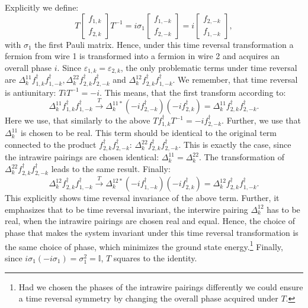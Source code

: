 Explicitly we define:
\begin{equation}
T\begin{bmatrix} f_{1,k} \\ f_{2,k} \end{bmatrix} T^{-1} = i\sigma_1 \begin{bmatrix} f_{1,-k} \\ f_{2,-k} \end{bmatrix} = i\begin{bmatrix} f_{2,-k} \\ f_{1,-k} \end{bmatrix},\nonumber
\end{equation} 
with $\sigma_1$ the first Pauli matrix. Hence, under this time reversal transformation a fermion from wire 1 is transformed into a fermion in wire 2 and acquires an overall phase $i$. Since $\varepsilon_{1,k} = \varepsilon_{2,k}$, the only problematic terms under time reversal are $\Delta^{11}_k f^\dagger_{1,k}f^\dagger_{1,-k}, \Delta^{22}_k f^\dagger_{2,k}f^\dagger_{2,-k}$ and $\Delta^{12}_kf^\dagger_{2,k}f^\dagger_{1,-k}$. We remember, that time reversal is antiunitary: $TiT^{-1} = -i$. This means, that the first transform according to:
\begin{equation}
\Delta^{11}_k f^\dagger_{1,k}f^\dagger_{1,-k} \overset{T}{\to} \Delta^{11*}_k \left(-i f^\dagger_{2,-k}\right)\left(-i f^\dagger_{2,k}\right) = \Delta^{11}_k f^\dagger_{2,k}f^\dagger_{2,-k}. \nonumber
\end{equation}
Here we use, that similarly to the above $Tf^\dagger_{1,k}T^{-1} = -i f^\dagger_{2,-k}$. Further, we use that $\Delta^{11}_k$ is chosen to be real. This term should be identical to the original term connected to the product $f^\dagger_{2,k}f^\dagger_{2,-k}$: $\Delta^{22}_k f^\dagger_{2,k}f^\dagger_{2,-k}$. This is exactly the case, since the intrawire pairings are chosen identical: $\Delta^{11}_k = \Delta^{22}_k$. The transformation of $\Delta^{22}_k f^\dagger_{2,k}f^\dagger_{2,-k}$ leads to the same result. Finally:
\begin{equation}
\Delta^{12}_k f^\dagger_{2,k}f^\dagger_{1,-k} \overset{T}{\to} \Delta^{12*}_k \left(-i f^\dagger_{1,-k}\right)\left(-i f^\dagger_{2,k}\right) = \Delta^{12}_k f^\dagger_{2,k}f^\dagger_{1,-k}. \nonumber
\end{equation}
This explicitly shows time reversal invariance of the above term. Further, it emphasizes that to be time reversal invariant, the interwire pairing $\Delta^{12}_k$ has to be real, when the intrawire pairings are chosen real and equal. Hence, the choice of phase that makes the system invariant under this time reversal transformation is the same choice of phase, which minimizes the ground state energy.\footnote{Had we chosen the phases of the intrawire pairings differently we could ensure a time reversal symmetry by changing the overall phase acquired under $T$.} Finally, since $i\sigma_1(-i\sigma_1) = \sigma_1^2 = \mathbb{I}$, $T$ squares to the identity.  

